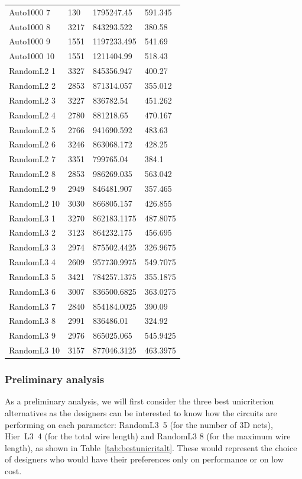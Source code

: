 \documentclass{svmult}
\begin{document}
\begin{small}
\begin{longtable}{p{2.3cm}p{1.5cm}p{2cm}p{1.3cm}}
    Auto1000 7 & 130 & 1795247.45 & 591.345 \\
    Auto1000 8 & 3217 & 843293.522 & 380.58 \\
    Auto1000 9 & 1551 & 1197233.495 & 541.69 \\
    Auto1000 10 & 1551 & 1211404.99 & 518.43 \\
    \hline
    RandomL2 1 & 3327 & 845356.947 & 400.27 \\
    RandomL2 2 & 2853 & 871314.057 & 355.012 \\
    RandomL2 3 & 3227 & 836782.54 & 451.262 \\
    RandomL2 4 & 2780 & 881218.65 & 470.167 \\
    RandomL2 5 & 2766 & 941690.592 & 483.63 \\
    RandomL2 6 & 3246 & 863068.172 & 428.25 \\
    RandomL2 7 & 3351 & 799765.04 & 384.1 \\
    RandomL2 8 & 2853 & 986269.035 & 563.042 \\
    RandomL2 9 & 2949 & 846481.907 & 357.465 \\
    RandomL2 10 & 3030 & 866805.157 & 426.855 \\
    \hline
    RandomL3 1 & 3270 & 862183.1175 & 487.8075 \\
    RandomL3 2 & 3123 & 864232.175 & 456.695 \\
    RandomL3 3 & 2974 & 875502.4425 & 326.9675 \\
    RandomL3 4 & 2609 & 957730.9975 & 549.7075 \\
    RandomL3 5 & 3421 & 784257.1375 & 355.1875 \\
    RandomL3 6 & 3007 & 836500.6825 & 363.0275 \\
    RandomL3 7 & 2840 & 854184.0025 & 390.09 \\
    RandomL3 8 & 2991 & 836486.01 & 324.92 \\
    RandomL3 9 & 2976 & 865025.065 & 545.9425 \\
    RandomL3 10 & 3157 & 877046.3125 & 463.3975 \\
    \hline
\end{longtable}
\end{small}

\subsubsection{Preliminary analysis}
As a preliminary analysis, we will first consider the three best unicriterion alternatives as the designers can be interested to know how the circuits are performing on each parameter: RandomL3~5 (for the number of 3D nets), Hier~L3~4 (for the total wire length) and RandomL3 8 (for the maximum wire length), as shown in Table~\ref{tab:bestunicritalt}. These would represent the choice of designers who would have their preferences only on performance or on low cost.
\end{document}

